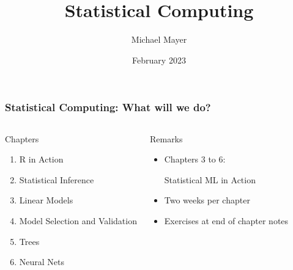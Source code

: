 \documentclass[utf8, aspectratio=169]{beamer}
\title{Statistical Computing}
\author{Michael Mayer}
\date{February 2023}
\begin{document}

\frame{\titlepage}

\begin{frame}
	\frametitle{Statistical Computing: What will we do?}
	\begin{columns}[onlytextwidth]
		\begin{block}{Chapters}
		\begin{enumerate}
			\item R in Action
			\item Statistical Inference
			\item Linear Models
			\item Model Selection and Validation
			\item Trees
			\item Neural Nets 
		\end{enumerate}
		\end{block}
		
		\begin{block}{Remarks}
			\begin{itemize}
				\item Chapters 3 to 6: 
				
				Statistical ML in Action
				\item Two weeks per chapter
				\item Exercises at end of chapter notes
			\end{itemize}
		\end{block}
	\end{columns}
\end{frame}

%
%
%
%
%


\end{document}
